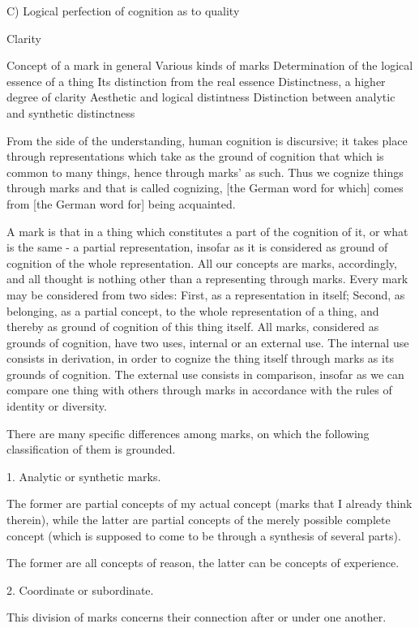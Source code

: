 C) Logical perfection of cognition as to quality

Clarity

    Concept of a mark in general
    Various kinds of marks
    Determination of the logical essence of a thing
    Its distinction from the real essence
    Distinctness, a higher degree of clarity
    Aesthetic and logical distintness
    Distinction between analytic and synthetic distinctness

From the side of the understanding, human cognition is discursive;
it takes place through representations which take as the ground of cognition
that which is common to many things, hence through marks' as such.
Thus we cognize things through marks and that is called cognizing,
[the German word for which] comes from [the German word for] being acquainted.

A mark is that in a thing which constitutes
a part of the cognition of it, or
what is the same - a partial representation,
insofar as it is considered as
ground of cognition of the whole representation.
All our concepts are marks, accordingly, and
all thought is nothing other than a representing through marks.
Every mark may be considered from two sides:
First, as a representation in itself;
Second, as belonging, as a partial concept, to
the whole representation of a thing, and thereby
as ground of cognition of this thing itself.
All marks, considered as grounds of cognition, have two uses,
internal or an external use.
The internal use consists in derivation,
in order to cognize the thing itself
through marks as its grounds of cognition.
The external use consists in comparison,
insofar as we can compare one thing with others
through marks in accordance with the rules of
identity or diversity.

There are many specific differences among marks,
on which the following classification of them is grounded.

1. Analytic or synthetic marks.

The former are partial concepts of my actual concept
(marks that I already think therein),
while the latter are partial concepts of the merely possible complete concept
(which is supposed to come to be through a synthesis of several parts).

The former are all concepts of reason,
the latter can be concepts of experience.

2. Coordinate or subordinate.

This division of marks concerns their connection after or under one another.


